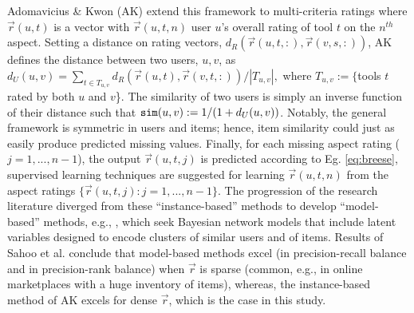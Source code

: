 Adomavicius \& Kwon (AK) \cite{adomavicius2007new} extend this framework to multi-criteria ratings where $\vec{r}(u,t)$ is a vector with $\vec{r}(u,t,n)$ user $u$'s overall rating of tool $t$ on the $n^{th}$ aspect. 
Setting a distance on rating vectors, $d_R(\vec{r}(u,t,:), \vec{r}(v,s,:))$, %
AK defines the distance between two users, $u, v$, as \\
$
 d_{U}(u,v) = \sum_{t\in T_{u,v}} d_R(\vec{r}(u,t), \vec{r}(v,t,:)) /|T_{u,v}|,
$
where $T_{u,v}:= \{$tools $t$ rated by both $u$ and $v$\}. The similarity of two users is simply an inverse function of their distance such that $\texttt{sim}(u,v):= 1/(1+d_{U}(u,v))$. 
Notably, the general framework is symmetric in users and items; hence, item similarity could just as easily produce predicted missing values. 
Finally, for each missing aspect rating ($j = 1, ..., n-1$), the output $\vec{r}(u,t,j)$ is predicted
according to Eg. \ref{eq:breese}, supervised learning techniques are suggested for learning $\vec{r}(u,t,n)$ from the aspect ratings $\{\vec{r}(u,t,j): j = 1, ..., n-1\}.$
 The progression of the research literature diverged from these ``instance-based'' methods to develop ``model-based'' methods, e.g., 
 \cite{hofmann1999latent, si2003flexible, sahoo2012research}, which seek Bayesian network models that include latent variables designed to encode clusters of similar users and of items.
Results of Sahoo et al. \cite{sahoo2012research} conclude that model-based methods excel (in precision-recall balance and in precision-rank balance) when $\vec{r}$ is sparse (common, e.g., in online marketplaces with a huge inventory of items), whereas, the instance-based method of AK excels
for dense $\vec{r}$, which is the case in this study. 

